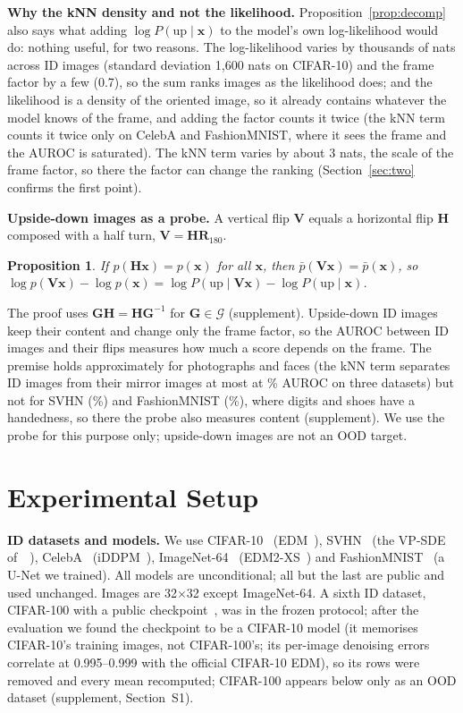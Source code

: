\documentclass{article}
\newtheorem{proposition}{Proposition}
\newcommand{\Rot}[1]{\mathbf{R}_{#1}}
\newcommand{\Vf}{\mathbf{V}}\newcommand{\Hf}{\mathbf{H}}
\newcommand{\mG}{\mathcal{G}}
\newcommand{\up}{\mathrm{up}}
\begin{document}
\textbf{Why the kNN density and not the likelihood.} Proposition~\ref{prop:decomp} also says what adding $\log P(\up\mid\mathbf{x})$ to the model's own log-likelihood would do: nothing useful, for two reasons. The log-likelihood varies by thousands of nats across ID images (standard deviation 1{,}600 nats on CIFAR-10) and the frame factor by a few (0.7), so the sum ranks images as the likelihood does; and the likelihood is a density of the oriented image, so it already contains whatever the model knows of the frame, and adding the factor counts it twice (the kNN term counts it twice only on CelebA and FashionMNIST, where it sees the frame and the AUROC is saturated). The kNN term varies by about 3 nats, the scale of the frame factor, so there the factor can change the ranking (Section~\ref{sec:two} confirms the first point).

\textbf{Upside-down images as a probe.} A vertical flip $\Vf$ equals a horizontal flip $\Hf$ composed with a half turn, $\Vf=\Hf\Rot{180}$.
\begin{proposition}
\label{prop:mirror}
If $p(\Hf\mathbf{x})=p(\mathbf{x})$ for all $\mathbf{x}$, then $\bar p(\Vf\mathbf{x})=\bar p(\mathbf{x})$, so $\log p(\Vf\mathbf{x})-\log p(\mathbf{x})=\log P(\up\mid\Vf\mathbf{x})-\log P(\up\mid\mathbf{x})$.
\end{proposition}
The proof uses $\mathbf{G}\Hf=\Hf\mathbf{G}^{-1}$ for $\mathbf{G}\in\mG$ (supplement). Upside-down ID images keep their content and change only the frame factor, so the AUROC between ID images and their flips measures how much a score depends on the frame. The premise holds approximately for photographs and faces (the kNN term separates ID images from their mirror images at most at \mirHknnOtherMax\% AUROC on three datasets) but not for SVHN (\mirHknnSVHN\%) and FashionMNIST (\mirHknnFM\%), where digits and shoes have a handedness, so there the probe also measures content (supplement). We use the probe for this purpose only; upside-down images are not an OOD target.

\section{Experimental Setup}
\label{sec:setup}
\textbf{ID datasets and models.} We use CIFAR-10~\cite{krizhevsky2009cifar} (EDM~\cite{karras2022edm}), SVHN~\cite{netzer2011svhn} (the VP-SDE of~\citeauthor{kamkari2024geometric}~), CelebA~\cite{liu2015celeba} (iDDPM~\cite{nichol2021improved}), ImageNet-64~\cite{chrabaszcz2017imagenet64} (EDM2-XS~\cite{karras2024edm2}) and FashionMNIST~\cite{xiao2017fmnist} (a U-Net we trained). All models are unconditional; all but the last are public and used unchanged. Images are 32$\times$32 except ImageNet-64. A sixth ID dataset, CIFAR-100 with a public checkpoint~\cite{chen2024robust}, was in the frozen protocol; after the evaluation we found the checkpoint to be a CIFAR-10 model (it memorises CIFAR-10's training images, not CIFAR-100's; its per-image denoising errors correlate at 0.995--0.999 with the official CIFAR-10 EDM), so its rows were removed and every mean recomputed; CIFAR-100 appears below only as an OOD dataset (supplement, Section~S1).
\end{document}
